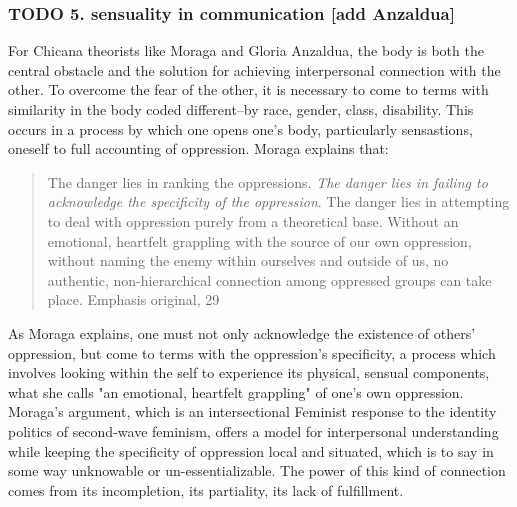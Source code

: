 \documentclass[11pt]{article}
\begin{document}
\subsubsection{{\bfseries\sffamily TODO} 5. sensuality in communication [add Anzaldua]}
\label{sec:orgbf3a897}
For Chicana theorists like Moraga and Gloria Anzaldua, the body is
both the central obstacle and the solution for achieving interpersonal
connection with the other. To overcome the fear of the other, it is
necessary to come to terms with similarity in the body coded
different--by race, gender, class, disability. This occurs in a
process by which one opens one's body, particularly sensastions,
oneself to full accounting of oppression. Moraga explains that:
\begin{quote}
The danger lies in ranking the oppressions. \emph{The danger lies in
failing to acknowledge the specificity of the oppression}. The danger
lies in attempting to deal with oppression purely from a theoretical
base. Without an emotional, heartfelt grappling with the source of our
own oppression, without naming the enemy within ourselves and outside
of us, no authentic, non-hierarchical connection among oppressed
groups can take place. Emphasis original, 29
\end{quote}
As Moraga explains, one must not only acknowledge the existence of
others' oppression, but come to terms with the oppression's
specificity, a process which involves looking within the self to
experience its physical, sensual components, what she calls "an
emotional, heartfelt grappling" of one's own oppression. Moraga's
argument, which is an intersectional Feminist response to the identity
politics of second-wave feminism, offers a model for interpersonal
understanding while keeping the specificity of oppression local and
situated, which is to say in some way unknowable or
un-essentializable. The power of this kind of connection comes from
its incompletion, its partiality, its lack of fulfillment. 
\end{document}

